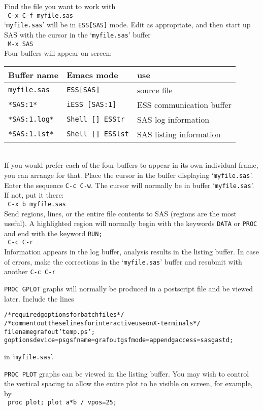 \documentclass{article}
\newcommand{\stexttt}[1]{{\small\texttt{#1}}}
\newcommand{\elcode}[1]{\\{\stexttt{\hspace*{2em} #1}}\\}
\newenvironment{Salltt}{\small\begin{alltt}}{\end{alltt}}
\newcommand{\file}[1]{`\stexttt{#1}'}
\begin{document}
Find the file you want to work with
    \elcode{C-x C-f myfile.sas}
\file{myfile.sas} will be in \stexttt{ESS[SAS]} mode.
Edit as appropriate, and then start up SAS with the cursor in
the \file{myfile.sas} buffer
    \elcode{M-x SAS}
Four buffers will appear on screen:\\
\begin{tabular}{lll}  \hline
  Buffer name     & Emacs mode         & use\\  \hline
  \stexttt{myfile.sas}  & \stexttt{ESS[SAS]}       &source file   \\
  \stexttt{*SAS:1*}     & \stexttt{iESS [SAS:1]}   &ESS communication buffer \\
  \stexttt{*SAS:1.log*} & \stexttt{Shell [] ESStr} &SAS log information      \\
  \stexttt{*SAS:1.lst*} & \stexttt{Shell [] ESSlst}&SAS listing information  \\
  \hline
\end{tabular}\\[1ex]
If you would prefer each of the four buffers to appear in its own
individual frame, you can arrange for that.  Place the cursor in the
buffer displaying \file{myfile.sas}.  Enter the sequence \stexttt{C-c C-w}.
The cursor will normally be in buffer \file{myfile.sas}.  If
not, put it there:
    \elcode{C-x b myfile.sas}
Send regions, lines, or the entire file contents to SAS
(regions are the most useful).  A highlighted region will normally
begin with the keywords \stexttt{DATA} or \stexttt{PROC} and end with the
keyword \stexttt{RUN;}
    \elcode{C-c C-r}
Information appears in the log buffer, analysis results in the
listing buffer.  In case of errors, make the corrections in the
\file{myfile.sas} buffer and resubmit with another \stexttt{C-c C-r}

\stexttt{PROC GPLOT} graphs will normally be produced in a postscript
file and be viewed later.  Include the lines
\begin{Salltt}
    /* required goptions for batch files */
    /* comment out these lines for interactive use on X-terminals*/
    filename grafout 'temp.ps';
    goptions device=ps gsfname=grafout gsfmode=append gaccess=sasgastd;
\end{Salltt}
\noindent
in \file{myfile.sas}.

\stexttt{PROC PLOT} graphs can be viewed in the listing buffer.  You
may wish to control the vertical spacing to allow the entire plot to
be visible on screen, for example, by
\elcode{proc plot; plot a*b / vpos=25;}
 
\end{document}
